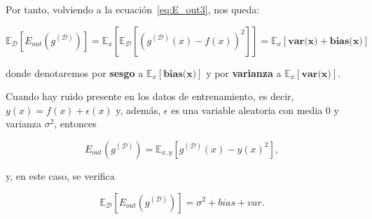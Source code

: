 Por tanto, volviendo a la ecuación~\eqref{eq:E_out3}, nos queda:

\begin{equation}\label{eq:E_out8}
    \mathbb{E}_{\mathcal{D}}[E_{out}(g^{\mathcal{(D)}})] = \mathbb{E}_{x}[\mathbb{E}_{\mathcal{D}}[{(g^{\mathcal{(D)}}(x) - f(x))}^2]] = \mathbb{E}_{x}[\textbf{var(x)} + \textbf{bias(x)}]
\end{equation}

donde denotaremos por \textbf{sesgo} a $\mathbb{E}_{x}[\textbf{bias(x)}]$ y por \textbf{varianza} a $\mathbb{E}_{x}[\textbf{var(x)}]$.\newline

\begin{observacion}
    Cuando hay ruido presente en los datos de entrenamiento, es decir, $y(x) = f(x) + \epsilon(x)$ y, además, $\epsilon$ es una variable aleatoria con media $0$ y varianza $\sigma^{2}$, entonces

    \[ E_{out}(g^{(\mathcal{D})}) = \mathbb{E}_{x, y}[g^{(\mathcal{D})}(x)-{y(x)}^{2}], \]

    y, en este caso, se verifica

    \[ \mathbb{E}_{\mathcal{D}}[E_{out}(g^{(\mathcal{D})})] = \sigma^{2} + bias + var. \]
\end{observacion}

